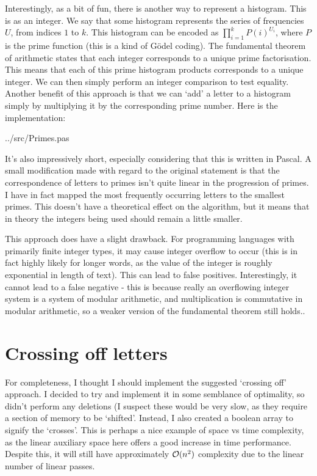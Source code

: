 \documentclass[fleqn,a4paper,11pt]{article}
\begin{document}
    Interestingly, as a bit of fun, there is another way to represent a
    histogram. This is as an integer. We say that some histogram represents the
    series of frequencies \(U\), from indices \(1\) to \(k\).  This histogram
    can be encoded as
    \(\prod\limits_{i=1}^{k} P(i)^{U_i}\),
    where \(P\) is the prime function (this is a kind of G\"odel coding). The
    fundamental theorem of arithmetic states that each integer corresponds to a
    unique prime factorisation. This means that each of this prime histogram
    products corresponds to a unique integer. We can then simply perform an
    integer comparison to test equality.  Another benefit of this approach is
    that we can `add' a letter to a histogram simply by multiplying it by the
    corresponding prime number. Here is the implementation:


{../src/Primes.pas}

    It's also impressively short, especially considering that this is written in
    Pascal. A small modification made with regard to the original statement is
    that the correspondence of letters to primes isn't quite linear in the
    progression of primes. I have in fact mapped the most frequently occurring
    letters to the smallest primes. This doesn't have a theoretical effect on
    the algorithm, but it means that in theory the integers being used should
    remain a little smaller.

    This approach does have a slight drawback. For programming languages with
    primarily finite integer types, it may cause integer overflow to occur (this
    is in fact highly likely for longer words, as the value of the integer is
    roughly exponential in length of text). This can lead to false positives.
    Interestingly, it cannot lead to a false negative - this is because really
    an overflowing integer system is a system of modular arithmetic, and
    multiplication is commutative in modular arithmetic, so a weaker version of
    the fundamental theorem still holds..

    \section{Crossing off letters}

    For completeness, I thought I should implement the suggested `crossing off'
    approach. I decided to try and implement it in some semblance of optimality,
    so didn't perform any deletions (I suspect these would be very slow, as they
    require a section of memory to be `shifted'. Instead, I also created a
    boolean array to signify the `crosses'. This is perhaps a nice example of
    space vs time complexity, as the linear auxiliary space here offers a good
    increase in time performance. Despite this, it will still have approximately
    \(\operatorname{\mathcal O}(n^2)\) complexity due to the linear number of linear passes.
\end{document}
